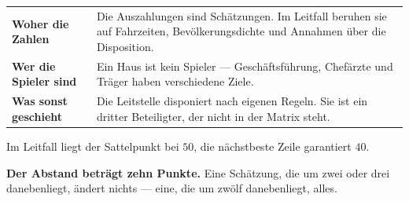 \begin{warnung}
\begin{center}
{\small
\renewcommand{\arraystretch}{1.52}
\begin{tabular}{@{}P{2.4cm}P{6.2cm}@{}}
\toprule
\textbf{Woher die Zahlen} & Die Auszahlungen sind Schätzungen. Im Leitfall beruhen sie auf Fahrzeiten, Bevölkerungsdichte und Annahmen über die Disposition.\\
\textbf{Wer die Spieler sind} & Ein Haus ist kein Spieler --- Geschäftsführung, Chefärzte und Träger haben verschiedene Ziele.\\
\textbf{Was sonst geschieht} & Die Leitstelle disponiert nach eigenen Regeln. Sie ist ein dritter Beteiligter, der nicht in der Matrix steht.\\
\bottomrule
\end{tabular}}
\end{center}

\begin{center}
\begin{minipage}{0.88\textwidth}
\end{minipage}
\end{center}

Im Leitfall liegt der Sattelpunkt bei $50$, die nächstbeste Zeile garantiert $40$.

\begin{center}
\begin{minipage}{0.9\textwidth}
\textbf{Der Abstand beträgt zehn Punkte.} Eine Schätzung, die um zwei oder drei danebenliegt, ändert nichts --- eine, die um zwölf danebenliegt, alles.
\end{minipage}
\end{center}

\begin{center}
\begin{minipage}{0.88\textwidth}
\end{minipage}
\end{center}
\end{warnung}

